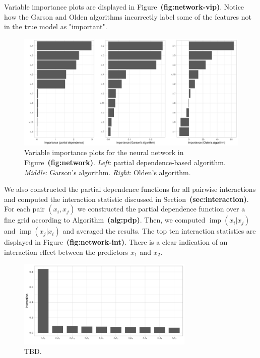 \documentclass[12pt]{article}
\def\ref#1{\textbf{(#1)}}
\DeclareMathOperator{\imp}{imp}
\begin{document}
Variable importance plots are displayed in Figure~\ref{fig:network-vip}. Notice how the Garson and Olden algorithms incorrectly label some of the features not in the true model as "important".
\begin{figure}[!htb]
  \label{network-vip}
  \centering
  \includegraphics[width=1.0\textwidth]{network-vip}
  \caption{Variable importance plots for the neural network in Figure~\ref{fig:network}. \textit{Left}: partial dependence-based algorithm. \textit{Middle}: Garson's algorithm. \textit{Right}: Olden's algorithm.}
\end{figure}

We also constructed the partial dependence functions for all pairwise interactions and computed the interaction statistic discussed in Section~\ref{sec:interaction}. For each pair $\left(x_i, x_j\right)$ we constructed the partial dependence function over a fine grid according to Algorithm~\ref{alg:pdp}. Then, we computed $\imp\left(x_i | x_j\right)$ and $\imp\left(x_j | x_i\right)$ and averaged the results. The top ten interaction statistics are displayed in Figure~\ref{fig:network-int}. There is a clear indication of an interaction effect between the predictors $x_1$ and $x_2$.
\begin{figure}[!htb]
  \label{network-int}
  \centering
  \includegraphics[width=0.75\textwidth]{network-int}
  \caption{TBD.}
\end{figure}
\end{document}
